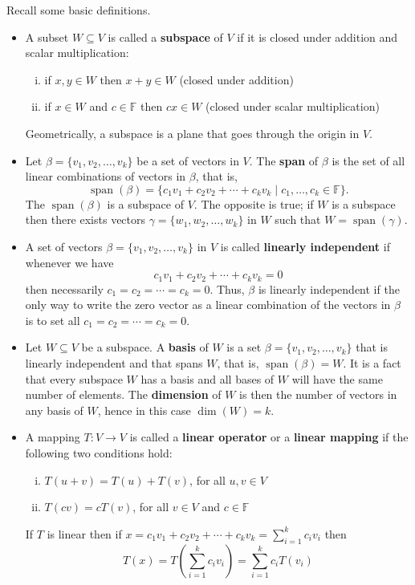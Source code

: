 \documentclass[12pt]{article}
\DeclareMathOperator{\spn}{span}
\newcommand{\tv}{T:V\rightarrow V}
\theoremstyle{definition}
\begin{document}
Recall some basic definitions.  
\begin{itemize}
\item A subset $W\subseteq V$ is called a \textbf{subspace} of $V$ if it is closed under addition and scalar multiplication:
\begin{enumerate}[(i)]
\item if $x, y\in W$ then $x+y\in W$ (closed under addition)
\item if $x\in W$ and $c\in\mathbb{F}$ then $cx \in W$ (closed under scalar multiplication)
\end{enumerate}
Geometrically, a subspace is a plane that goes through the origin in $V$.

\item Let $\beta=\{v_1,v_2,\ldots,v_k\}$ be a set of vectors in $V$.  The \textbf{span} of $\beta$ is the set of all linear combinations of vectors in $\beta$, that is,
\[
\spn(\beta) = \{c_1 v_1 + c_2 v_2 + \cdots + c_k v_k\; |\; c_1,\ldots,c_k\in\mathbb{F} \}.
\]
The $\spn(\beta)$ is a subspace of $V$.  The opposite is true; if $W$ is a subspace then there exists vectors $\gamma=\{w_1,w_2,\ldots,w_k\}$ in $W$ such that $W=\spn(\gamma)$.

\item A set of vectors $\beta=\{v_1,v_2,\ldots,v_k\}$ in $V$ is called \textbf{linearly independent} if whenever we have
\[
c_1 v_1 + c_2 v_2 + \cdots + c_k v_k = 0
\]
then necessarily $c_1=c_2=\cdots=c_k=0$.  Thus, $\beta$ is linearly independent if the only way to write the zero vector as a linear combination of the vectors in $\beta$ is to set all $c_1=c_2=\cdots=c_k=0$.

\item Let $W\subseteq V$ be a subspace.  A \textbf{basis} of $W$ is a set $\beta=\{v_1,v_2,\ldots,v_k\}$ that is linearly independent and that spans $W$, that is, $\spn(\beta) = W$.   It is a fact that every subspace $W$ has a basis and all bases of $W$ will have the same number of elements.  The \textbf{dimension} of $W$ is then the number of vectors in any basis of $W$, hence in this case $\dim(W) = k$. 

\item A mapping $\tv$ is called a \textbf{linear operator} or a \textbf{linear mapping} if the following two conditions hold:
\begin{enumerate}[(i)]
\item $T(u+v) = T(u) + T(v)$, for all $u,v\in V$
\item $T(c v) = c T(v)$, for all $v\in V$ and $c\in\mathbb{F}$
\end{enumerate}
If $T$ is linear then if $x = c_1 v_1 + c_2 v_2 + \cdots + c_k v_k = \sum_{i=1}^k c_i v_i$ then
\[
T(x) = T\left(\sum_{i=1}^k c_i v_i\right) = \sum_{i=1}^k c_i T(v_i)
\]


\end{itemize}
\end{document}
